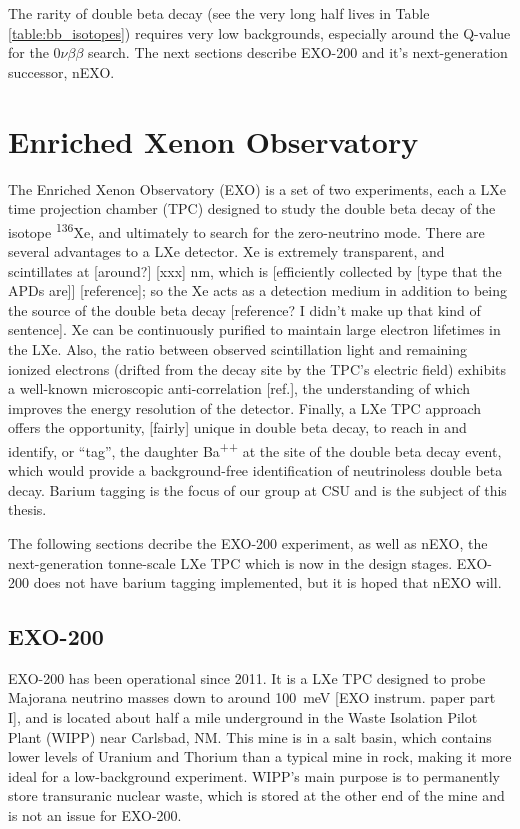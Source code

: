 The rarity of double beta decay (see the very long half lives in Table \ref{table:bb_isotopes}) requires very low backgrounds, especially around the Q-value for the $0\nu\beta\beta$ search. The next sections describe EXO-200 and it's next-generation successor, nEXO.

\section{Enriched Xenon Observatory}

The Enriched Xenon Observatory (EXO) is a set of two experiments, each a LXe time projection chamber (TPC) designed to study the double beta decay of the isotope \textsuperscript{136}Xe, and ultimately to search for the zero-neutrino mode.  There are several advantages to a LXe detector.  Xe is extremely transparent, and scintillates at [around?] [xxx] nm, which is [efficiently collected by [type that the APDs are]] [reference]; so the Xe acts as a detection medium in addition to being the source of the double beta decay [reference? I didn't make up that kind of sentence].  Xe can be continuously purified to maintain large electron lifetimes in the LXe.  Also, the ratio between observed scintillation light and remaining ionized electrons (drifted from the decay site by the TPC's electric field) exhibits a well-known microscopic anti-correlation [ref.], the understanding of which improves the energy resolution of the detector.  Finally, a LXe TPC approach offers the opportunity, [fairly] unique in double beta decay, to reach in and identify, or ``tag'', the daughter Ba\textsuperscript{++} at the site of the double beta decay event, which would provide a background-free identification of neutrinoless double beta decay. Barium tagging is the focus of our group at CSU and is the subject of this thesis.

The following sections decribe the EXO-200 experiment, as well as nEXO, the next-generation tonne-scale LXe TPC which is now in the design stages.  EXO-200 does not have barium tagging implemented, but it is hoped that nEXO will. 

\subsection{EXO-200}

EXO-200 has been operational since 2011.  It is a LXe TPC designed to probe Majorana neutrino masses down to around 100~meV [EXO instrum. paper part I], and is located about half a mile underground in the Waste Isolation Pilot Plant (WIPP) near Carlsbad, NM.  This mine is in a salt basin, which contains lower levels of Uranium and Thorium than a typical mine in rock, making it more ideal for a low-background experiment.  WIPP's main purpose is to permanently store transuranic nuclear waste, which is stored at the other end of the mine and is not an issue for EXO-200.

